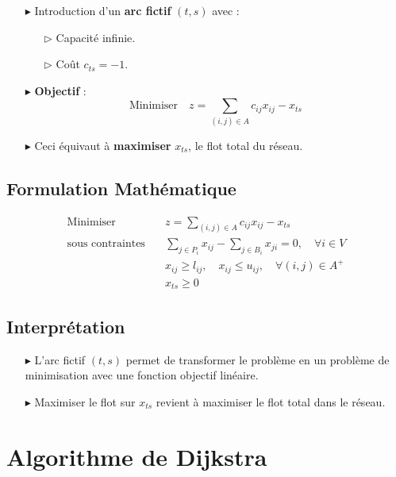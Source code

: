 \documentclass{report}
\begin{document}
\begin{multicols*}{2}
        \begin{itemize}
            \item[$\blacktriangleright$] Introduction d'un \textbf{arc fictif} \( (t, s) \) avec :
                \begin{itemize}
                    \item[$\rhd$] Capacité infinie.
                    \item[$\rhd$] Coût \( c_{ts} = -1 \).
                \end{itemize}
            \item[$\blacktriangleright$] \textbf{Objectif} :
            \[%
                \text{Minimiser} \quad z = \sum_{(i,j) \in A} c_{ij} x_{ij} - x_{ts}
            \]%
            \item[$\blacktriangleright$] Ceci équivaut à \textbf{maximiser} \( x_{ts} \), le flot total du réseau.
        \end{itemize}

    \subsection{Formulation Mathématique}

\begin{align*}
\text{Minimiser} \quad & z = \sum_{(i,j) \in A} c_{ij} x_{ij} - x_{ts} \\
\text{sous contraintes} \quad & \sum_{j \in P_i} x_{ij} - \sum_{j \in B_i} x_{ji} = 0, \quad \forall i \in V \\
& x_{ij} \geq l_{ij}, \quad x_{ij} \leq u_{ij}, \quad \forall (i,j) \in A^+ \\
& x_{ts} \geq 0
\end{align*}

\subsection{Interprétation}

\begin{itemize}
    \item[$\blacktriangleright$] L'arc fictif \( (t, s) \) permet de transformer le problème en un problème de minimisation avec une fonction objectif linéaire.
    \item[$\blacktriangleright$] Maximiser le flot sur \( x_{ts} \) revient à maximiser le flot total dans le réseau.
\end{itemize}
\section{Algorithme de Dijkstra}


\end{multicols*}
\end{document}
